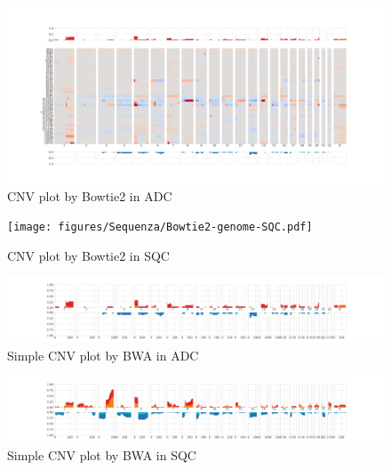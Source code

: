 \documentclass[a4paper]{article}
\begin{document}
                \begin{figure}[htbp]
                    \centering
                    \includegraphics[width=\linewidth]{figures/Sequenza/Bowtie2-genome-ADC.pdf}
                    \caption{CNV plot by Bowtie2 in ADC}
                    \label{fig:CNV-Bowtie2-ADC}
                \end{figure}

                \begin{figure}[htbp]
                    \centering
                    \texttt{[image: figures/Sequenza/Bowtie2-genome-SQC.pdf]}
                    \caption{CNV plot by Bowtie2 in SQC}
                    \label{fig:CNV-Bowtie2-SQC}
                \end{figure}

                \begin{figure}[htbp]
                    \centering
                    \includegraphics[width=\linewidth]{figures/Sequenza/BWA-simple-ADC.pdf}
                    \caption{Simple CNV plot by BWA in ADC}
                    \label{fig:SimpleCNV-BWA-ADC}
                \end{figure}

                \begin{figure}[htbp]
                    \centering
                    \includegraphics[width=\linewidth]{figures/Sequenza/BWA-simple-SQC.pdf}
                    \caption{Simple CNV plot by BWA in SQC}
                    \label{fig:SimpleCNV-BWA-SQC}
                \end{figure}
\end{document}

